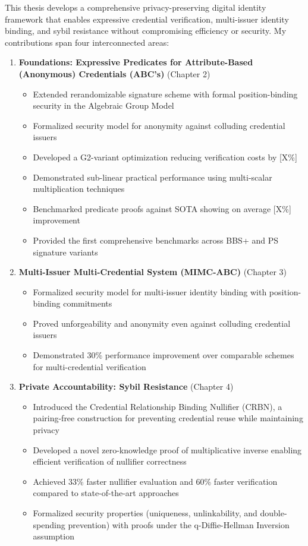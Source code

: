 This thesis develops a comprehensive privacy-preserving digital identity framework that enables expressive credential verification, multi-issuer identity binding, and sybil resistance without compromising efficiency or security. My contributions span four interconnected areas:

\begin{enumerate}
    \item \textbf{Foundations: Expressive Predicates for Attribute-Based (Anonymous) Credentials (ABC's)} (Chapter 2)
    \begin{itemize}
        \item Extended rerandomizable signature scheme with formal position-binding security in the Algebraic Group Model
        \item Formalized security model for anonymity against colluding credential issuers
        \item Developed a G2-variant optimization reducing verification costs by [X\%]
        \item Demonstrated sub-linear practical performance using multi-scalar multiplication techniques
        \item Benchmarked predicate proofs against SOTA showing on average [X\%] improvement
        \item Provided the first comprehensive benchmarks across BBS+ and PS signature variants
    \end{itemize}

    \item \textbf{Multi-Issuer Multi-Credential System (MIMC-ABC)} (Chapter 3)
    \begin{itemize}
        \item Formalized security model for multi-issuer identity binding with position-binding commitments
        \item Proved unforgeability and anonymity even against colluding credential issuers
        \item Demonstrated 30\% performance improvement over comparable schemes for multi-credential verification
    \end{itemize}
    
    \item \textbf{Private Accountability: Sybil Resistance} (Chapter 4)
        \begin{itemize}
            \item Introduced the Credential Relationship Binding Nullifier (CRBN), a pairing-free construction for preventing credential reuse while maintaining privacy
            \item Developed a novel zero-knowledge proof of multiplicative inverse enabling efficient verification of nullifier correctness
            \item Achieved 33\% faster nullifier evaluation and 60\% faster verification compared to state-of-the-art approaches
            \item Formalized security properties (uniqueness, unlinkability, and double-spending prevention) with proofs under the q-Diffie-Hellman Inversion assumption
        \end{itemize}


\end{enumerate}

